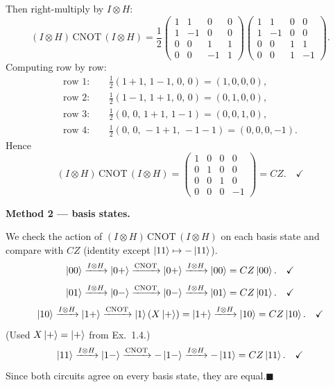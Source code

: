\documentclass{ceri/sty/rapport}
\begin{document}
\begin{solution}
Then right-multiply by $I\otimes H$:
\[
  (I\otimes H)\,\mathrm{CNOT}\,(I\otimes H)
  = \frac{1}{2}
    \begin{pmatrix}1&1&0&0\\1&-1&0&0\\0&0&1&1\\0&0&-1&1\end{pmatrix}
    \begin{pmatrix}1&1&0&0\\1&-1&0&0\\0&0&1&1\\0&0&1&-1\end{pmatrix}.
\]
Computing row by row:
\begin{align*}
  \text{row }1:&\quad \tfrac{1}{2}(1{+}1,\,1{-}1,\,0,\,0) = (1,0,0,0),\\
  \text{row }2:&\quad \tfrac{1}{2}(1{-}1,\,1{+}1,\,0,\,0) = (0,1,0,0),\\
  \text{row }3:&\quad \tfrac{1}{2}(0,\,0,\,1{+}1,\,1{-}1) = (0,0,1,0),\\
  \text{row }4:&\quad \tfrac{1}{2}(0,\,0,\,-1{+}1,\,-1{-}1) = (0,0,0,-1).
\end{align*}
Hence
\[
  (I\otimes H)\,\mathrm{CNOT}\,(I\otimes H)
  = \begin{pmatrix}1&0&0&0\\0&1&0&0\\0&0&1&0\\0&0&0&-1\end{pmatrix}
  = CZ.\quad\checkmark
\]

\bigskip\noindent
\textbf{Method 2 — basis states.}

We check the action of $(I\otimes H)\,\mathrm{CNOT}\,(I\otimes H)$ on each basis state
and compare with $CZ$ (identity except $\ket{11}\mapsto-\ket{11}$).
\[
\ket{00}\xrightarrow{I\otimes H}\ket{0+}\xrightarrow{\mathrm{CNOT}}\ket{0+}\xrightarrow{I\otimes H}\ket{00}=CZ\ket{00}.\quad\checkmark
\]
\[
\ket{01}\xrightarrow{I\otimes H}\ket{0-}\xrightarrow{\mathrm{CNOT}}\ket{0-}\xrightarrow{I\otimes H}\ket{01}=CZ\ket{01}.\quad\checkmark
\]
\[
\ket{10}\xrightarrow{I\otimes H}\ket{1+}\xrightarrow{\mathrm{CNOT}}\ket{1}(X\ket{+})=\ket{1+}\xrightarrow{I\otimes H}\ket{10}=CZ\ket{10}.\quad\checkmark
\]
(Used $X\ket{+}=\ket{+}$ from Ex.~1.4.)
\[
\ket{11}\xrightarrow{I\otimes H}\ket{1-}\xrightarrow{\mathrm{CNOT}}-\ket{1-}\xrightarrow{I\otimes H}-\ket{11}=CZ\ket{11}.\quad\checkmark
\]
Since both circuits agree on every basis state, they are equal.\quad$\blacksquare$
\end{solution}
\end{document}
